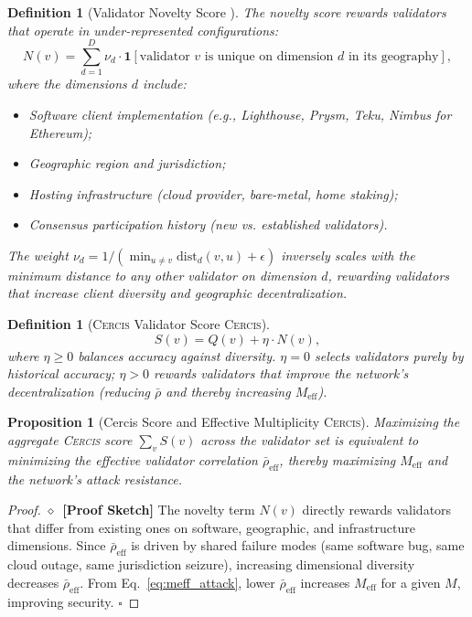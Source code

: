 \documentclass[11pt,a4paper]{article}
\newtheorem{proposition}[theorem]{Proposition}
\newtheorem{definition}[theorem]{Definition}
\theoremstyle{definition}
\newcommand{\rigorSketch}[0]{$\diamond$~\textbf{[Proof Sketch]}}
\newcommand{\Cercis}{\textsc{Cercis}}
\newcommand{\ind}[1]{\mathbf{1}[#1]}
\begin{document}
\begin{definition}[Validator Novelty Score ]
\label{def:validator_N}
The novelty score rewards validators that operate in under-represented configurations:
\begin{equation}
    N(v) = \sum_{d=1}^{D} \nu_d \cdot \ind{\text{validator $v$ is unique on dimension $d$ in its geography}},
    \label{eq:validator_N}
\end{equation}
where the dimensions $d$ include:
\begin{itemize}
    \item Software client implementation (e.g., Lighthouse, Prysm, Teku, Nimbus for Ethereum);
    \item Geographic region and jurisdiction;
    \item Hosting infrastructure (cloud provider, bare-metal, home staking);
    \item Consensus participation history (new vs. established validators).
\end{itemize}
The weight $\nu_d = 1 / (\min_{u \neq v} \mathrm{dist}_d(v, u) + \epsilon)$ inversely scales with the minimum distance to any other validator on dimension $d$, rewarding validators that increase client diversity and geographic decentralization.
\end{definition}
\begin{definition}[\Cercis{} Validator Score \Cercis{}]
\label{def:cercis_validator}
\begin{equation}
    S(v) = Q(v) + \eta \cdot N(v),
    \label{eq:cercis_validator_score}
\end{equation}
where $\eta \geq 0$ balances accuracy against diversity. $\eta = 0$ selects validators purely by historical accuracy; $\eta > 0$ rewards validators that improve the network's decentralization (reducing $\bar{\rho}$ and thereby increasing $M_{\mathrm{eff}}$).
\end{definition}
\begin{proposition}[Cercis Score and Effective Multiplicity \Cercis{}]
\label{prop:cercis_meff}
Maximizing the aggregate \Cercis{} score $\sum_v S(v)$ across the validator set is equivalent to minimizing the effective validator correlation $\bar{\rho}_{\mathrm{eff}}$, thereby maximizing $M_{\mathrm{eff}}$ and the network's attack resistance.
\end{proposition}
\begin{proof}\rigorSketch
The novelty term $N(v)$ directly rewards validators that differ from existing ones on software, geographic, and infrastructure dimensions. Since $\bar{\rho}_{\mathrm{eff}}$ is driven by shared failure modes (same software bug, same cloud outage, same jurisdiction seizure), increasing dimensional diversity decreases $\bar{\rho}_{\mathrm{eff}}$. From Eq.~\ref{eq:meff_attack}, lower $\bar{\rho}_{\mathrm{eff}}$ increases $M_{\mathrm{eff}}$ for a given $M$, improving security. $\square$
\end{proof}
\end{document}
